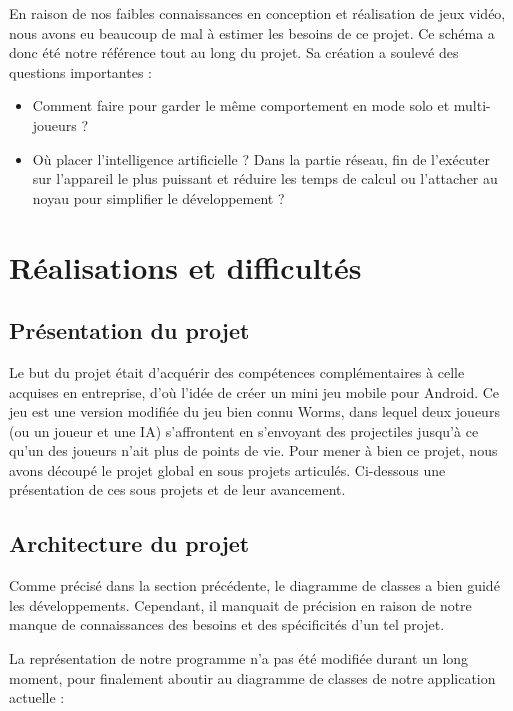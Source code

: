 \documentclass{report}
\begin{document}
En raison de nos faibles connaissances en conception et réalisation de
jeux vidéo, nous avons eu beaucoup de mal à estimer les besoins de ce
projet. Ce schéma a donc été notre référence tout au long du projet. Sa
création a soulevé des questions importantes :

\begin{itemize}
\item Comment faire pour garder le même comportement en mode solo et
multi-joueurs ?
\item Où placer l’intelligence artificielle ? Dans la partie réseau,
fin de l’exécuter sur l’appareil le plus puissant et réduire les temps
de calcul ou l’attacher au noyau pour simplifier le développement ?
\end{itemize}

\newpage

\section{Réalisations et difficultés}
\bigskip


\subsection{Présentation du projet}
\bigskip


Le but du projet était d'acquérir des compétences complémentaires à
celle acquises en entreprise, d’où l’idée de créer un mini jeu mobile
pour Android. Ce jeu est une version modifiée du jeu bien connu Worms,
dans lequel deux joueurs (ou un joueur et une IA) s’affrontent en
s’envoyant des projectiles jusqu’à ce qu’un des joueurs n’ait plus de
points de vie.
Pour mener à bien ce projet, nous avons découpé le projet global en
sous projets articulés. Ci-dessous une présentation de ces sous projets
et de leur avancement.

\subsection{Architecture du projet}
\bigskip


Comme précisé dans la section précédente, le diagramme de classes a bien
guidé les développements. Cependant, il manquait de précision en raison
de notre manque de connaissances des besoins et des spécificités d’un
tel projet.

La représentation de notre programme n’a pas été modifiée durant un
long moment, pour finalement aboutir au diagramme de classes de notre
application actuelle :
\end{document}
